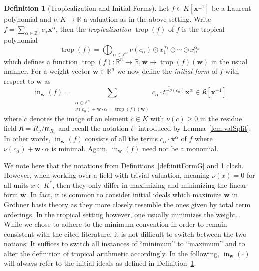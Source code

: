 \documentclass[
  paper=a4,
  titlepage,
  bibliography=totoc,
  listof=totoc,
  pagesize=pdftex
]{scrartcl}
\numberwithin{figure}{section}
\numberwithin{equation}{section}
\numberwithin{table}{section}
\newcommand*\setZ{\mathds{Z}}
\newcommand*\setR{\mathds{R}}
\let\vec\mathbf
\DeclareMathOperator{\trop}{trop}
\DeclareMathOperator{\initial}{in}
\theoremstyle{definition}
\newtheorem{definition}{Definition}
\numberwithin{definition}{section}
\begin{document}
\begin{definition}[Tropicalization and Initial Forms]
  \label{def:initialId}
  Let $f \in K[\vec x^{\pm1}]$ be a Laurent polynomial and $\nu : K \to \setR$ a valuation
  as in the above setting. Write $f = \sum_{\alpha \in \setZ^n} c_\alpha \vec x^\alpha$,
  then the \emph{tropicalization} $\trop(f)$ of $f$ is the tropical polynomial
  \[
    \trop(f) = \bigoplus_{\alpha\in\setZ^\alpha} \nu(c_\alpha)
    \odot x_1^{\alpha_1}\odot\cdots \odot x_n^{\alpha_n}
  \]
  which defines a function $\trop(f) : \setR^n \to \setR, \vec w \mapsto \trop(f)(\vec w)$
  in the usual manner. For a weight vector $\vec w \in \setR^n$ we now define the
  \emph{initial form} of $f$ with respect to $\vec w$ as
  \[
    \initial_{\vec w}(f) =
    \sum_{ \substack{
        \alpha \in \setZ^n \\
        \nu(c_\alpha) + \vec w\cdot \alpha = \trop(f)(\vec w)
    }} \overline {c_\alpha \cdot t^{-\nu(c_\alpha)} } \vec x^\alpha
    \in \mathfrak K[\vec x^{\pm1}]
  \]
  where $\overline{c}$ denotes the image of an element $c \in K$ with $\nu(c)\geq0$ in the
  residue field $\mathfrak K = R_\nu/\mathfrak m_{R_\nu}$ and recall the notation $t^z$
  introduced by Lemma~\ref{lem:valSplit}. In other words, $\initial_{\vec w}(f)$ consists
  of all the terms $c_\alpha\cdot \vec x^\alpha$ of $f$ where $\nu(c_\alpha)+\vec w\cdot
  \alpha$ is minimal. Again, $\initial_{\vec w}(f)$ need not be a monomial.
\end{definition}

We note here that the notations from Definitions~\ref{def:initFormG} and
\ref{def:initialId} clash. However, when working over a field with trivial valuation,
meaning $\nu(x) = 0$ for all units $x \in K^*$, then they only differ in maximizing and
minimizing the linear form $\vec w$. In fact, it is common to consider initial ideals
which maximize $\vec w$ in Gröbner basis theory as they more closely resemble the ones
given by total term orderings. In the tropical setting however, one usually minimizes
the weight. While we chose to adhere to the minimum-convention in order to remain
consistent with the cited literature, it is not difficult to switch between the two
notions: It suffices to switch all instances of \enquote{minimum} to \enquote{maximum} and
to alter the definition of tropical arithmetic accordingly. In the following,
$\initial_{\vec w}(\cdot)$ will always refer to the initial ideals as defined in
Definition~\ref{def:initialId}.
\end{document}
